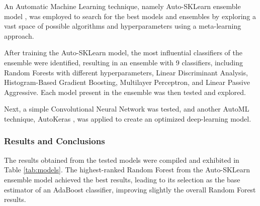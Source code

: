 An Automatic Machine Learning technique, namely Auto-SKLearn ensemble model \cite{feurerneurips15a}, was employed to search for the best models and ensembles by exploring a vast space of possible algorithms and hyperparameters using a meta-learning approach.

After training the Auto-SKLearn model, the most influential classifiers of the ensemble were identified, resulting in an ensemble with 9 classifiers, including Random Forests with different hyperparameters, Linear Discriminant Analysis, Histogram-Based Gradient Boosting, Multilayer Perceptron, and Linear Passive Aggressive. Each model present in the ensemble was then tested and explored.

Next, a simple Convolutional Neural Network was tested, and another AutoML technique, AutoKeras \cite{jin2019auto}, was applied to create an optimized deep-learning model.

\subsubsection{Results and Conclusions}

The results obtained from the tested models were compiled and exhibited in Table \ref{tab:models}. The highest-ranked Random Forest from the Auto-SKLearn ensemble model achieved the best results, leading to its selection as the base estimator of an AdaBoost classifier, improving slightly the overall Random Forest results.

